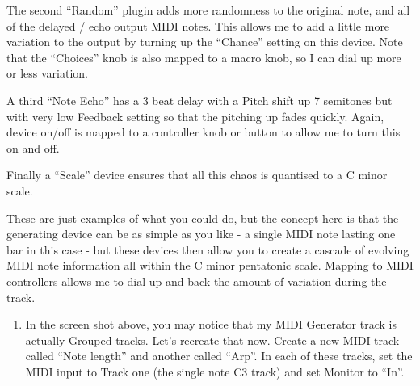 \documentclass[
  12pt,
  letterpaper,
  oneside,
  open=any]{scrbook}
\providecommand{\tightlist}{%
  \setlength{\itemsep}{0pt}\setlength{\parskip}{0pt}}\usepackage{longtable,booktabs,array}
\begin{document}
The second ``Random'' plugin adds more randomness to the original note,
and all of the delayed / echo output MIDI notes. This allows me to add a
little more variation to the output by turning up the ``Chance'' setting
on this device. Note that the ``Choices'' knob is also mapped to a macro
knob, so I can dial up more or less variation.

A third ``Note Echo'' has a 3 beat delay with a Pitch shift up 7
semitones but with very low Feedback setting so that the pitching up
fades quickly. Again, device on/off is mapped to a controller knob or
button to allow me to turn this on and off.

Finally a ``Scale'' device ensures that all this chaos is quantised to a
C minor scale.

These are just examples of what you could do, but the concept here is
that the generating device can be as simple as you like - a single MIDI
note lasting one bar in this case - but these devices then allow you to
create a cascade of evolving MIDI note information all within the C
minor pentatonic scale. Mapping to MIDI controllers allows me to dial up
and back the amount of variation during the track.

\begin{enumerate}
\def\labelenumi{\arabic{enumi}.}
\setcounter{enumi}{6}
\tightlist
\item
  In the screen shot above, you may notice that my MIDI Generator track
  is actually Grouped tracks. Let's recreate that now. Create a new MIDI
  track called ``Note length'' and another called ``Arp''. In each of
  these tracks, set the MIDI input to Track one (the single note C3
  track) and set Monitor to ``In''.
\end{enumerate}
\end{document}

